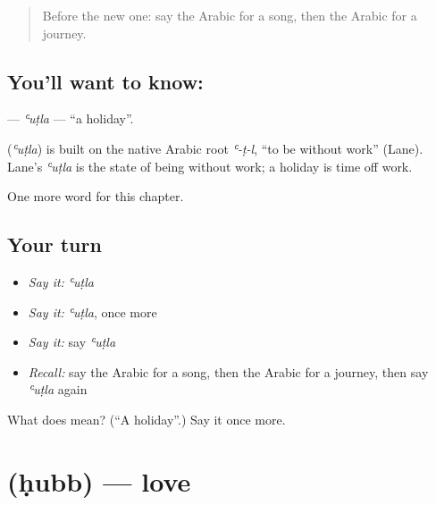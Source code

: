 \label{lesson:AR-C98-utla}



\begin{quote}
Before the new one: say the Arabic for a song, then the Arabic for a journey.
\end{quote}

\subsection*{You'll want to know: }
\textbf{} — \emph{ʿuṭla} — \textquotedblleft{}a holiday\textquotedblright{}.

\begin{cousinweb}
\textbf{} (\emph{ʿuṭla}) is built on the native Arabic root \emph{ʿ-ṭ-l}, \textquotedblleft{}to be without work\textquotedblright{} (Lane). Lane's \emph{ʿuṭla} is the state of being without work; a holiday is time off work.
\end{cousinweb}

\begin{grammarlens}[title={What you've built}]
One more word for this chapter.
\end{grammarlens}

\subsection*{Your turn}
\begin{itemize}
\raggedright
  \item \emph{Say it:} \emph{ʿuṭla}
  \item \emph{Say it:} \emph{ʿuṭla}, once more
  \item \emph{Say it:} say \emph{ʿuṭla}
  \item \emph{Recall:} say the Arabic for a song, then the Arabic for a journey, then say \emph{ʿuṭla} again
\end{itemize}

\begin{tcolorbox}[breakable,colback=teal!4,colframe=teal!35!black,title={Before you move on}]
What does  mean? (\textquotedblleft{}A holiday\textquotedblright{}.) Say it once more.
\end{tcolorbox}
\section[\texorpdfstring{\ar{حب} (ḥubb)}{حب (ḥubb)}]{ (ḥubb) — love}

\label{lesson:AR-C98-hubb}



